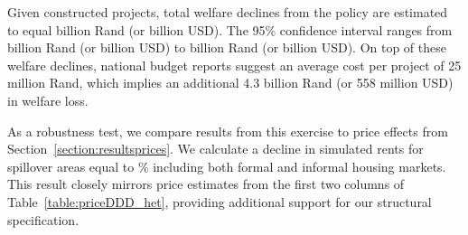 \documentclass[12pt]{article}
\begin{document}
Given constructed projects, total welfare declines from the policy are estimated to equal billion Rand (or billion USD).  The 95\% confidence interval ranges from billion Rand (or billion USD) to billion Rand (or billion USD).  On top of these welfare declines, national budget reports suggest an average cost per project of 25 million Rand, which implies an additional 4.3 billion Rand (or 558 million USD) in welfare loss.  

As a robustness test, we compare results from this exercise to price effects from Section~\ref{section:resultsprices}.  We calculate a decline in simulated rents for spillover areas equal to \unskip\% including both formal and informal housing markets.  This result closely mirrors price estimates from the first two columns of Table~\ref{table:priceDDD_het}, providing additional support for our structural specification.

\end{document}

